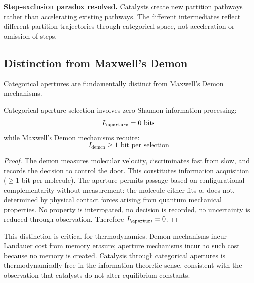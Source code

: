 \textbf{Step-exclusion paradox resolved.} Catalysts create new partition pathways rather than accelerating existing pathways. The different intermediates reflect different partition trajectories through categorical space, not acceleration or omission of steps.

\subsection{Distinction from Maxwell's Demon}

Categorical apertures are fundamentally distinct from Maxwell's Demon mechanisms.

\begin{theorem}
\label{thm:aperture_demon}
Categorical aperture selection involves zero Shannon information processing:
\begin{equation}
I_{\aperture} = 0 \text{ bits}
\end{equation}
while Maxwell's Demon mechanisms require:
\begin{equation}
I_{\mathrm{demon}} \geq 1 \text{ bit per selection}
\end{equation}
\end{theorem}

\begin{proof}
The demon measures molecular velocity, discriminates fast from slow, and records the decision to control the door. This constitutes information acquisition ($\geq 1$ bit per molecule). The aperture permits passage based on configurational complementarity without measurement: the molecule either fits or does not, determined by physical contact forces arising from quantum mechanical properties. No property is interrogated, no decision is recorded, no uncertainty is reduced through observation. Therefore $I_{\aperture} = 0$.
\end{proof}

This distinction is critical for thermodynamics. Demon mechanisms incur Landauer cost from memory erasure; aperture mechanisms incur no such cost because no memory is created. Catalysis through categorical apertures is thermodynamically free in the information-theoretic sense, consistent with the observation that catalysts do not alter equilibrium constants.
